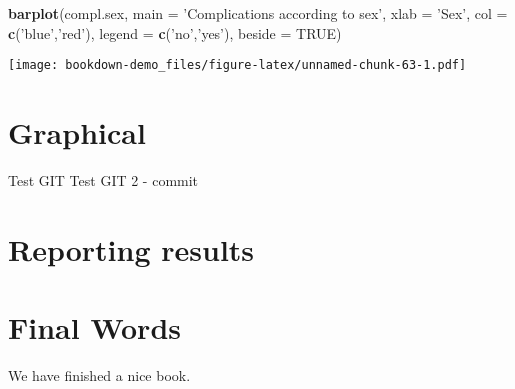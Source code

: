 \documentclass[]{book}
\newenvironment{Shaded}{\begin{snugshade}}{\end{snugshade}}
\newcommand{\KeywordTok}[1]{\textcolor[rgb]{0.13,0.29,0.53}{\textbf{#1}}}
\newcommand{\DataTypeTok}[1]{\textcolor[rgb]{0.13,0.29,0.53}{#1}}
\newcommand{\StringTok}[1]{\textcolor[rgb]{0.31,0.60,0.02}{#1}}
\newcommand{\OtherTok}[1]{\textcolor[rgb]{0.56,0.35,0.01}{#1}}
\newcommand{\NormalTok}[1]{#1}
\theoremstyle{definition}
\theoremstyle{definition}
\theoremstyle{remark}
\begin{document}
\begin{Shaded}
\begin{Highlighting}[]
\KeywordTok{barplot}\NormalTok{(compl.sex,}
        \DataTypeTok{main =} \StringTok{'Complications according to sex'}\NormalTok{,}
        \DataTypeTok{xlab =} \StringTok{'Sex'}\NormalTok{,}
        \DataTypeTok{col =} \KeywordTok{c}\NormalTok{(}\StringTok{'blue'}\NormalTok{,}\StringTok{'red'}\NormalTok{),}
        \DataTypeTok{legend =} \KeywordTok{c}\NormalTok{(}\StringTok{'no'}\NormalTok{,}\StringTok{'yes'}\NormalTok{),}
        \DataTypeTok{beside =} \OtherTok{TRUE}\NormalTok{)}
\end{Highlighting}
\end{Shaded}

\texttt{[image: bookdown-demo\_files/figure-latex/unnamed-chunk-63-1.pdf]}

\chapter{Graphical}\label{graphical}

Test GIT Test GIT 2 - commit

\chapter{Reporting results}\label{reporting-results}

\chapter{Final Words}\label{final-words}

We have finished a nice book.


\end{document}
